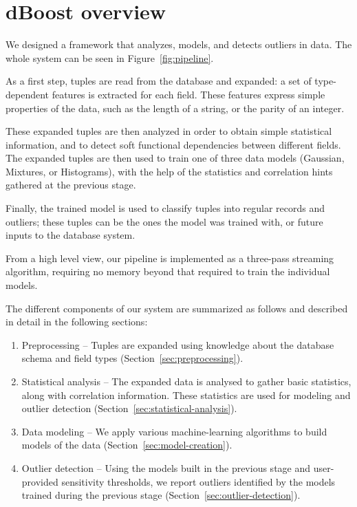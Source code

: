 \section{dBoost overview}
\label{sec:overview}

We designed a framework that analyzes, models, and detects outliers in data.
The whole system can be seen in Figure~\ref{fig:pipeline}.

As a first step, tuples are read from the database and expanded: a set of type-dependent features is extracted for each field. These features express simple properties of the data, such as the length of a string, or the parity of an integer.

These expanded tuples are then analyzed in order to obtain simple statistical information, and to detect soft functional dependencies between different fields. The expanded tuples are then used to train one of three data models (Gaussian, Mixtures, or Histograms), with the help of the statistics and correlation hints gathered at the previous stage.

Finally, the trained model is used to classify tuples into regular records and outliers; these tuples can be the ones the model was trained with, or future inputs to the database system.

From a high level view, our pipeline is implemented as a three-pass streaming algorithm, requiring no memory beyond that required to train the individual models.

The different components of our system are summarized as follows and described in detail in the following sections:

\begin{enumerate}
\item Preprocessing -- Tuples are expanded using knowledge about the database schema and field types (Section~\ref{sec:preprocessing}).
\item Statistical analysis -- The expanded data is analysed to gather basic statistics, along with correlation information. These statistics are used for modeling and outlier detection (Section~\ref{sec:statistical-analysis}).
\item Data modeling -- We apply various machine-learning algorithms to build models of the data (Section~\ref{sec:model-creation}).
\item Outlier detection -- Using the models built in the previous stage and user-provided sensitivity thresholds, we report outliers identified by the models trained during the previous stage (Section~\ref{sec:outlier-detection}).
\end{enumerate}

